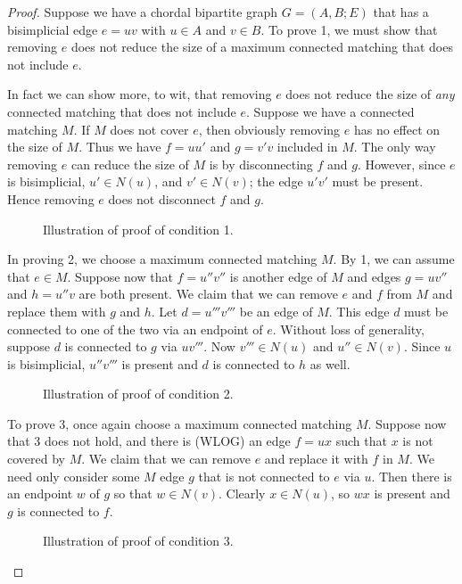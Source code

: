 \begin{proof}
Suppose we have a chordal bipartite graph $G = (A,B;E)$ that has a bisimplicial edge $e = uv$ with $u \in A$ and $v \in B$.  
%
To prove 1, we must show that removing $e$ does not reduce the size of a maximum connected matching that does not include $e$. 

In fact we can show more, to wit, that removing $e$ does not reduce the size of {\it any} connected matching that does not include $e$.  
%
Suppose we have a connected matching $M$.  
%
If $M$ does not cover $e$, then obviously removing $e$ has no effect on the size of $M$.  
%
Thus we have $f = uu'$ and $g = v'v$ included in $M$.  
%
The only way removing $e$ can reduce the size of $M$ is by disconnecting $f$ and $g$.  
%
However, since $e$ is bisimplicial, $u' \in N(u)$, and $v' \in N(v)$; the edge $u'v'$ must be present.  
%
Hence removing $e$ does not disconnect $f$ and $g$.
\begin{figure}
	\begin{center}
	
	\end{center}
	\label{first_part}
	\caption{Illustration of proof of condition 1.}
\end{figure}
%
In proving 2, we choose a maximum connected matching $M$.  
%
By 1, we can assume that $e \in M$.  
%
Suppose now that $f = u''v''$ is another edge of $M$ and edges $g = uv''$ and $h = u''v$ are both present.  
%
We claim that we can remove $e$ and $f$ from $M$ and replace them with $g$ and $h$. 
%
 Let $d = u'''v'''$ be an edge of $M$.  
%
This edge $d$ must be connected to one of the two via an endpoint of $e$.  
%
Without loss of generality, suppose $d$ is connected to $g$ via $uv'''$.  
%
Now $v''' \in N(u)$ and $u'' \in N(v)$.  
%
Since $u$ is bisimplicial, $u''v'''$ is present and $d$ is connected to $h$ as well.
\begin{figure}
	\begin{center}
	
	\end{center}
	\label{second_part}
	\caption{Illustration of proof of condition 2.}
\end{figure}
%
To prove 3, once again choose a maximum connected matching $M$.  
%
Suppose now that 3 does not hold, and there is (WLOG) an edge $f = ux$ such that $x$ is not covered by $M$.  
%
We claim that we can remove $e$ and replace it with $f$ in $M$.  We need only consider some $M$ edge $g$ that is not connected to $e$ via $u$.  
%
Then there is an endpoint $w$ of $g$ so that $w \in N(v)$.  
%
Clearly $x\in N(u)$, so $wx$ is present and $g$ is connected to $f$.
\begin{figure}
	\begin{center}
	
	\end{center}
	\label{third_part}
	\caption{Illustration of proof of condition 3.}
\end{figure}
\end{proof} 

